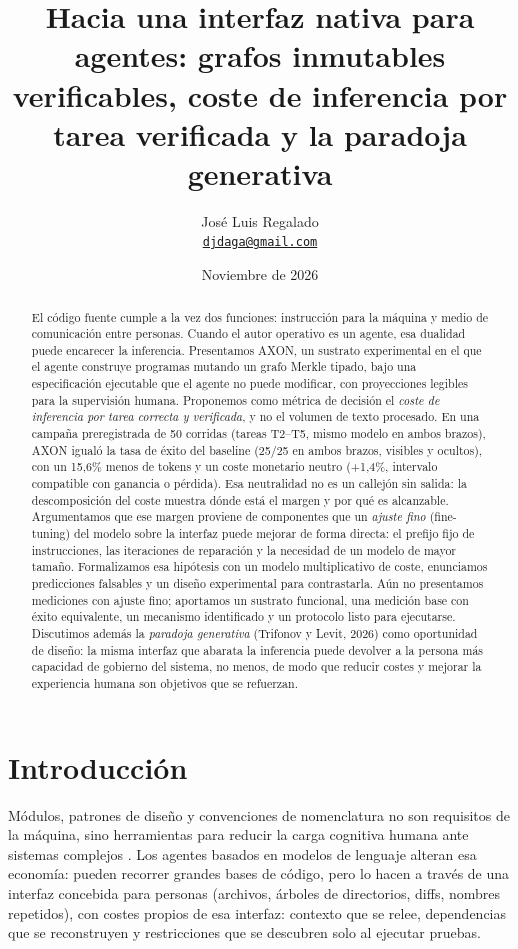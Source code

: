 \documentclass[11pt, a4paper]{article}
\title{\textbf{Hacia una interfaz nativa para agentes: grafos inmutables verificables, coste de inferencia por tarea verificada y la paradoja generativa}}
\author{José Luis Regalado\\\href{mailto:djdaga@gmail.com}{\texttt{djdaga@gmail.com}}}
\date{Noviembre de 2026}
\newcommand{\pc}{\mbox{\%}}
\begin{document}
\maketitle

\begin{abstract}
El código fuente cumple a la vez dos funciones: instrucción para la máquina y medio de comunicación entre personas. Cuando el autor operativo es un agente, esa dualidad puede encarecer la inferencia. Presentamos AXON, un sustrato experimental en el que el agente construye programas mutando un grafo Merkle tipado, bajo una especificación ejecutable que el agente no puede modificar, con proyecciones legibles para la supervisión humana. Proponemos como métrica de decisión el \emph{coste de inferencia por tarea correcta y verificada}, y no el volumen de texto procesado. En una campaña preregistrada de 50 corridas (tareas T2--T5, mismo modelo en ambos brazos), AXON igualó la tasa de éxito del baseline (25/25 en ambos brazos, visibles y ocultos), con un 15,6\pc{} menos de tokens y un coste monetario neutro (+1,4\pc, intervalo compatible con ganancia o pérdida). Esa neutralidad no es un callejón sin salida: la descomposición del coste muestra dónde está el margen y por qué es alcanzable. Argumentamos que ese margen proviene de componentes que un \emph{ajuste fino} (fine-tuning) del modelo sobre la interfaz puede mejorar de forma directa: el prefijo fijo de instrucciones, las iteraciones de reparación y la necesidad de un modelo de mayor tamaño. Formalizamos esa hipótesis con un modelo multiplicativo de coste, enunciamos predicciones falsables y un diseño experimental para contrastarla. Aún no presentamos mediciones con ajuste fino; aportamos un sustrato funcional, una medición base con éxito equivalente, un mecanismo identificado y un protocolo listo para ejecutarse. Discutimos además la \emph{paradoja generativa} (Trifonov y Levit, 2026) como oportunidad de diseño: la misma interfaz que abarata la inferencia puede devolver a la persona más capacidad de gobierno del sistema, no menos, de modo que reducir costes y mejorar la experiencia humana son objetivos que se refuerzan.
\end{abstract}

\section{Introducción}

Módulos, patrones de diseño y convenciones de nomenclatura no son requisitos de la máquina, sino herramientas para reducir la carga cognitiva humana ante sistemas complejos \cite{cao2026}. Los agentes basados en modelos de lenguaje alteran esa economía: pueden recorrer grandes bases de código, pero lo hacen a través de una interfaz concebida para personas (archivos, árboles de directorios, diffs, nombres repetidos), con costes propios de esa interfaz: contexto que se relee, dependencias que se reconstruyen y restricciones que se descubren solo al ejecutar pruebas.
\end{document}
